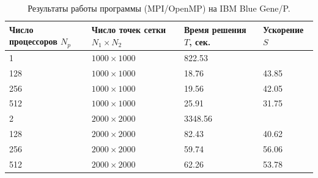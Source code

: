 \documentclass[11pt]{article}
\numberwithin{equation}{section}
\theoremstyle{plain}
\theoremstyle{definition}
\begin{document}
\begin{table}[h]
\centering
\begin{tabular}{|l|l|l|l|}\hline
Число процессоров $N_p$ & Число точек сетки $N_1 \times N_2$ & Время решения $T$, сек. & Ускорение $S$ \\ \hline
1                       & $1000 \times 1000$                 & 822.53                  &               \\
128                     & $1000 \times 1000$                 & 18.76                   & 43.85         \\
256                     & $1000 \times 1000$                 & 19.56                   & 42.05         \\
512                     & $1000 \times 1000$                 & 25.91                   & 31.75         \\ \hline
2                       & $2000 \times 2000$                 & 3348.56                 &               \\
128                     & $2000 \times 2000$                 & 82.43                   & 40.62         \\
256                     & $2000 \times 2000$                 & 59.74                   & 56.06         \\
512                     & $2000 \times 2000$                 & 62.26                   & 53.78         \\ \hline
\end{tabular}
    \caption{Результаты работы программы (MPI/OpenMP) на IBM Blue Gene/P.}
\label{tab_openmp}
\end{table}
\end{document}
